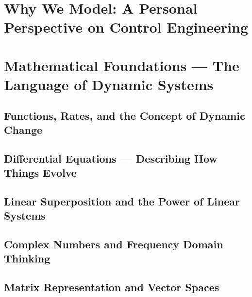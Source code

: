 \documentclass[11pt,letterpaper]{article}
\begin{document}
\section{Why We Model: A Personal Perspective on Control Engineering}
\label{sec:why_we_model}



\section{Mathematical Foundations --- The Language of Dynamic Systems}
\label{sec:mathematical_foundations}

\subsection{Functions, Rates, and the Concept of Dynamic Change}
\label{sec:functions_rates}



\subsection{Differential Equations --- Describing How Things Evolve}
\label{sec:differential_equations}



\subsection{Linear Superposition and the Power of Linear Systems}
\label{sec:linear_superposition}



\subsection{Complex Numbers and Frequency Domain Thinking}
\label{sec:complex_numbers}



\subsection{Matrix Representation and Vector Spaces}
\label{sec:matrix_representation}
\end{document}
